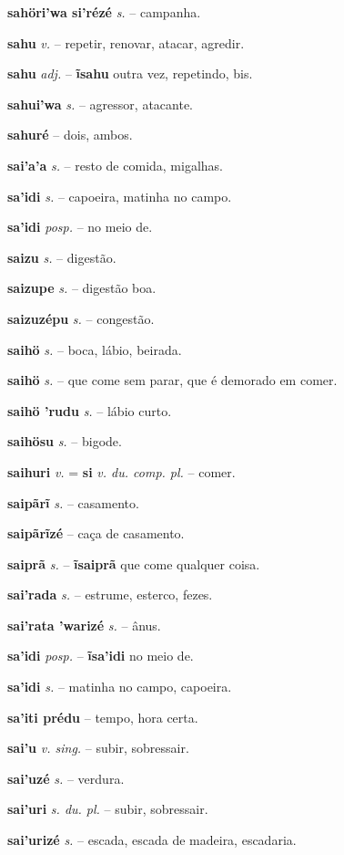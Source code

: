 \textbf{sahöri'wa si'rézé} \textit{s.} -- campanha.

\textbf{sahu} \textit{v.} -- repetir, renovar, atacar, agredir.

\textbf{sahu} \textit{adj.} -- \textbf{ĩsahu} outra vez, repetindo, bis.

\textbf{sahui'wa} \textit{s.} -- agressor, atacante.

\textbf{sahuré} -- dois, ambos.

\textbf{sai'a'a} \textit{s.} -- resto de comida, migalhas.

\textbf{sa'idi} \textit{s.} -- capoeira, matinha no campo.

\textbf{sa'idi} \textit{posp.} -- no meio de.

\textbf{saizu} \textit{s.} -- digestão.

\textbf{saizupe} \textit{s.} -- digestão boa.

\textbf{saizuzépu} \textit{s.} -- congestão.

\textbf{saihö} \textit{s.} -- boca, lábio, beirada.

\textbf{saihö} \textit{s.} -- que come sem parar, que é demorado em comer.

\textbf{saihö 'rudu} \textit{s.} -- lábio curto.

\textbf{saihösu} \textit{s.} -- bigode.

\textbf{saihuri} \textit{v.} = \textbf{si} \textit{v. du. comp. pl.} -- comer.

\textbf{saipãrĩ} \textit{s.} -- casamento.

\textbf{saipãrĩzé} \textit{} -- caça de casamento.

\textbf{saiprã} \textit{s.} -- \textbf{ĩsaiprã} que come qualquer coisa.

\textbf{sai'rada} \textit{s.} -- estrume, esterco, fezes.

\textbf{sai'rata 'warizé} \textit{s.} -- ânus.

\textbf{sa'idi} \textit{posp.} -- \textbf{ĩsa'idi} no meio de.

\textbf{sa'idi} \textit{s.} -- matinha no campo, capoeira.

\textbf{sa'iti prédu} \textit{} -- tempo, hora certa.

\textbf{sai'u} \textit{v. sing.} -- subir, sobressair.

\textbf{sai'uzé} \textit{s.} -- verdura.

\textbf{sai'uri} \textit{s. du. pl.} -- subir, sobressair.

\textbf{sai'urizé} \textit{s.} -- escada, escada de madeira, escadaria.

